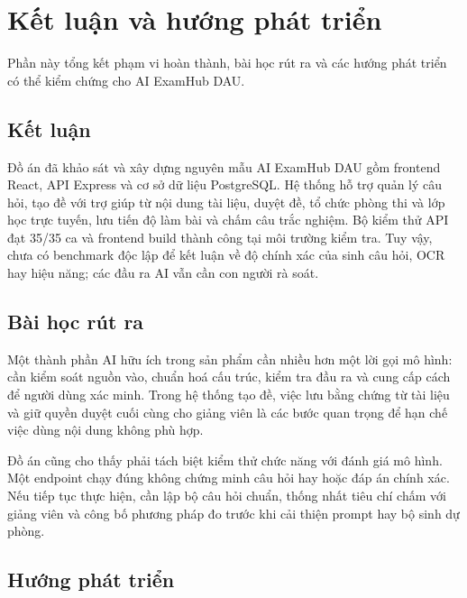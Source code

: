 \section{Kết luận và hướng phát triển}
\label{sec:ketluan}

\begin{muctieu}
Phần này tổng kết phạm vi hoàn thành, bài học rút ra và các hướng phát
triển có thể kiểm chứng cho AI ExamHub DAU.
\end{muctieu}

\subsection{Kết luận}

Đồ án đã khảo sát và xây dựng nguyên mẫu AI ExamHub DAU gồm frontend React,
API Express và cơ sở dữ liệu PostgreSQL. Hệ thống hỗ trợ quản lý câu hỏi,
tạo đề với trợ giúp từ nội dung tài liệu, duyệt đề, tổ chức phòng thi và
lớp học trực tuyến, lưu tiến độ làm bài và chấm câu trắc nghiệm. Bộ kiểm
thử API đạt 35/35 ca và frontend build thành công tại môi trường kiểm tra.
Tuy vậy, chưa có benchmark độc lập để kết luận về độ chính xác của sinh câu
hỏi, OCR hay hiệu năng; các đầu ra AI vẫn cần con người rà soát.

\subsection{Bài học rút ra}

Một thành phần AI hữu ích trong sản phẩm cần nhiều hơn một lời gọi mô hình:
cần kiểm soát nguồn vào, chuẩn hoá cấu trúc, kiểm tra đầu ra và cung cấp
cách để người dùng xác minh. Trong hệ thống tạo đề, việc lưu bằng chứng từ
tài liệu và giữ quyền duyệt cuối cùng cho giảng viên là các bước quan trọng
để hạn chế việc dùng nội dung không phù hợp.

Đồ án cũng cho thấy phải tách biệt kiểm thử chức năng với đánh giá mô hình.
Một endpoint chạy đúng không chứng minh câu hỏi hay hoặc đáp án chính xác.
Nếu tiếp tục thực hiện, cần lập bộ câu hỏi chuẩn, thống nhất tiêu chí chấm
với giảng viên và công bố phương pháp đo trước khi cải thiện prompt hay bộ
sinh dự phòng.

\subsection{Hướng phát triển}

